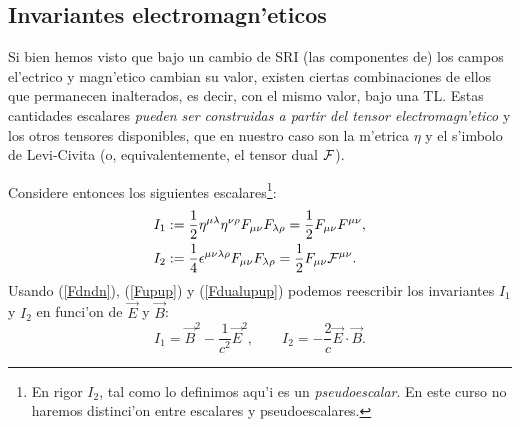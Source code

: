 

\subsection{Invariantes electromagn'eticos}

Si bien hemos visto que bajo un cambio de SRI (las componentes de) los campos
el'ectrico y magn'etico cambian su valor, existen ciertas combinaciones de ellos que permanecen inalterados, es decir, con el mismo valor, bajo una TL. Estas cantidades escalares \textit{pueden ser construidas a partir del tensor electromagn'etico} y los otros tensores disponibles, que en nuestro caso son la m'etrica $\eta$ y el s'imbolo de Levi-Civita (o, equivalentemente, el tensor dual $\cal F$).

Considere entonces los siguientes escalares\footnote{En rigor $I_2$, tal como lo definimos aqu'i es un \textit{pseudoescalar}. En este curso no haremos
distinci'on entre escalares y pseudoescalares.}:
\begin{align}
I_1 & :=\frac{1}{2}\eta^{\mu\lambda}\eta^{\nu\rho}F_{\mu\nu}F_{\lambda\rho}=\frac{1}{2}F_{\mu\nu}F^{\mu\nu},\\
I_2 & :=\frac{1}{4}\epsilon^{\mu\nu\lambda\rho}F_{\mu\nu}F_{\lambda\rho}
= \frac{1}{2}F_{\mu\nu}{\cal F}^{\mu\nu}.
\end{align}
Usando (\ref{Fdndn}), (\ref{Fupup}) y (\ref{Fdualupup}) podemos reescribir los invariantes $I_1$ y $I_2$ en funci'on de $\vec{E}$ y $\vec{B}$:
\begin{equation}
I_1=\vec{B}^2-\frac{1}{c^2}\vec{E}^2, \qquad I_2  =-\frac{2}{c}\vec{E}\cdot\vec{B}.
\end{equation}

